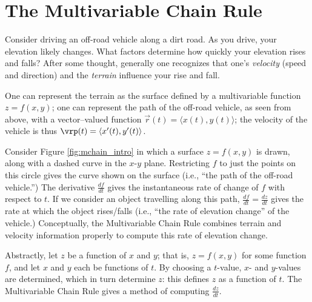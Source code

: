 \section{The Multivariable Chain Rule}\label{sec:multi_chain}
Consider driving an off-road vehicle along a dirt road. As you drive, your elevation likely changes. What factors determine how quickly your elevation rises and falls? 
After some thought, generally one recognizes that one's \emph{velocity} (speed and direction) and the \emph{terrain} influence your rise and fall. 

One can represent the terrain as the surface defined by a multivariable function $z=f(x,y)$; one can represent the path of the off-road vehicle, as seen from above, with a vector--valued function $\vec r(t) = \langle x(t), y(t)\rangle$; the velocity of the vehicle is thus $\vrp(t) = \langle x'(t),y'(t)\rangle$.

Consider Figure \ref{fig:mchain_intro} in which a surface $z=f(x,y)$ is drawn, along with a dashed curve in the $x$-$y$ plane. Restricting $f$ to just the points on this circle gives the curve shown on the surface (i.e., ``the path of the off-road vehicle.'') The derivative $\frac{df}{dt}$ gives the instantaneous rate of change of $f$ with respect to $t$. If we consider an object travelling along this path, $\frac{df}{dt}=\frac{dz}{dt}$ gives the rate at which the object rises/falls (i.e., ``the rate of elevation change'' of the vehicle.) Conceptually, the Multivariable Chain Rule combines terrain and velocity information properly to compute this rate of elevation change. 




Abstractly, let $z$ be a function of $x$ and $y$; that is, $z=f(x,y)$ for some function $f$, and let $x$ and $y$ each be functions of $t$. By choosing a $t$-value, $x$- and $y$-values are determined, which in turn determine $z$: this defines $z$ as a function of $t$. The Multivariable Chain Rule gives a method of computing $ \frac{dz}{dt}$.



